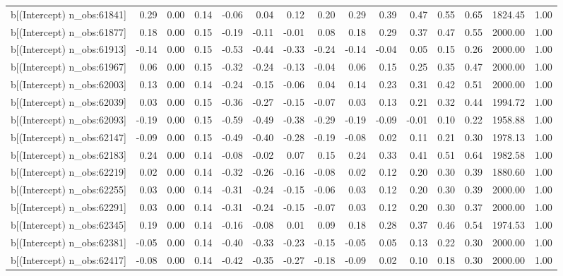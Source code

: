 \begin{table}[ht]
\begin{tabular}{rrrrrrrrrrrrrrr}
  b[(Intercept) n\_obs:61841] & 0.29 & 0.00 & 0.14 & -0.06 & 0.04 & 0.12 & 0.20 & 0.29 & 0.39 & 0.47 & 0.55 & 0.65 & 1824.45 & 1.00 \\ 
  b[(Intercept) n\_obs:61877] & 0.18 & 0.00 & 0.15 & -0.19 & -0.11 & -0.01 & 0.08 & 0.18 & 0.29 & 0.37 & 0.47 & 0.55 & 2000.00 & 1.00 \\ 
  b[(Intercept) n\_obs:61913] & -0.14 & 0.00 & 0.15 & -0.53 & -0.44 & -0.33 & -0.24 & -0.14 & -0.04 & 0.05 & 0.15 & 0.26 & 2000.00 & 1.00 \\ 
  b[(Intercept) n\_obs:61967] & 0.06 & 0.00 & 0.15 & -0.32 & -0.24 & -0.13 & -0.04 & 0.06 & 0.15 & 0.25 & 0.35 & 0.47 & 2000.00 & 1.00 \\ 
  b[(Intercept) n\_obs:62003] & 0.13 & 0.00 & 0.14 & -0.24 & -0.15 & -0.06 & 0.04 & 0.14 & 0.23 & 0.31 & 0.42 & 0.51 & 2000.00 & 1.00 \\ 
  b[(Intercept) n\_obs:62039] & 0.03 & 0.00 & 0.15 & -0.36 & -0.27 & -0.15 & -0.07 & 0.03 & 0.13 & 0.21 & 0.32 & 0.44 & 1994.72 & 1.00 \\ 
  b[(Intercept) n\_obs:62093] & -0.19 & 0.00 & 0.15 & -0.59 & -0.49 & -0.38 & -0.29 & -0.19 & -0.09 & -0.01 & 0.10 & 0.22 & 1958.88 & 1.00 \\ 
  b[(Intercept) n\_obs:62147] & -0.09 & 0.00 & 0.15 & -0.49 & -0.40 & -0.28 & -0.19 & -0.08 & 0.02 & 0.11 & 0.21 & 0.30 & 1978.13 & 1.00 \\ 
  b[(Intercept) n\_obs:62183] & 0.24 & 0.00 & 0.14 & -0.08 & -0.02 & 0.07 & 0.15 & 0.24 & 0.33 & 0.41 & 0.51 & 0.64 & 1982.58 & 1.00 \\ 
  b[(Intercept) n\_obs:62219] & 0.02 & 0.00 & 0.14 & -0.32 & -0.26 & -0.16 & -0.08 & 0.02 & 0.12 & 0.20 & 0.30 & 0.39 & 1880.60 & 1.00 \\ 
  b[(Intercept) n\_obs:62255] & 0.03 & 0.00 & 0.14 & -0.31 & -0.24 & -0.15 & -0.06 & 0.03 & 0.12 & 0.20 & 0.30 & 0.39 & 2000.00 & 1.00 \\ 
  b[(Intercept) n\_obs:62291] & 0.03 & 0.00 & 0.14 & -0.31 & -0.24 & -0.15 & -0.07 & 0.03 & 0.12 & 0.20 & 0.30 & 0.37 & 2000.00 & 1.00 \\ 
  b[(Intercept) n\_obs:62345] & 0.19 & 0.00 & 0.14 & -0.16 & -0.08 & 0.01 & 0.09 & 0.18 & 0.28 & 0.37 & 0.46 & 0.54 & 1974.53 & 1.00 \\ 
  b[(Intercept) n\_obs:62381] & -0.05 & 0.00 & 0.14 & -0.40 & -0.33 & -0.23 & -0.15 & -0.05 & 0.05 & 0.13 & 0.22 & 0.30 & 2000.00 & 1.00 \\ 
  b[(Intercept) n\_obs:62417] & -0.08 & 0.00 & 0.14 & -0.42 & -0.35 & -0.27 & -0.18 & -0.09 & 0.02 & 0.10 & 0.18 & 0.30 & 2000.00 & 1.00 \\ 

\end{tabular}
\end{table}
